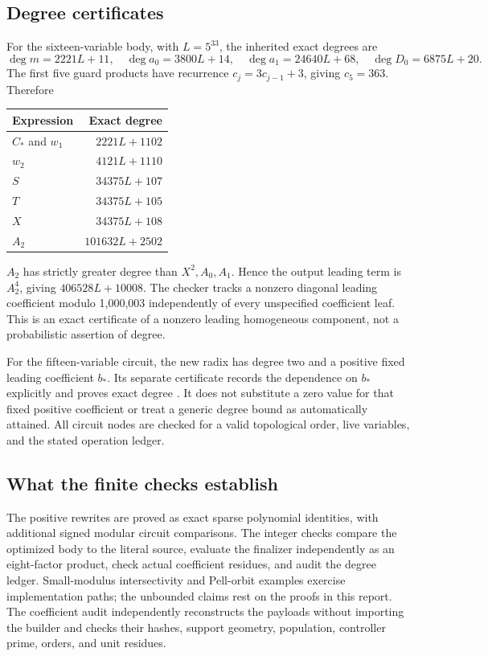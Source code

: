 \documentclass[11pt]{article}
\theoremstyle{definition}\newtheorem{definition}[theorem]{Definition}
\begin{document}
\subsection{Degree certificates}
For the sixteen-variable body, with $L=5^{33}$, the inherited exact degrees are
\[
 \deg m=2221L+11,\quad\deg a_0=3800L+14,\quad
 \deg a_1=24640L+68,\quad\deg D_0=6875L+20.
\]
The first five guard products have recurrence $c_j=3c_{j-1}+3$, giving $c_5=363$. Therefore
\begin{center}
\begin{tabular}{lr}
\toprule
Expression & Exact degree\\
\midrule
$C_*$ and $w_1$ & $2221L+1102$\\
$w_2$ & $4121L+1110$\\
$S$ & $34375L+107$\\
$T$ & $34375L+105$\\
$X$ & $34375L+108$\\
$A_2$ & $101632L+2502$\\
\bottomrule
\end{tabular}
\end{center}
$A_2$ has strictly greater degree than $X^2,A_0,A_1$. Hence the output leading term is $A_2^4$, giving $406528L+10008$. The checker tracks a nonzero diagonal leading coefficient modulo 1,000,003 independently of every unspecified coefficient leaf. This is an exact certificate of a nonzero leading homogeneous component, not a probabilistic assertion of degree.

For the fifteen-variable circuit, the new radix has degree two and a positive fixed leading coefficient $b_*$. Its separate certificate records the dependence on $b_*$ explicitly and proves exact degree \DegreeFifteenFormula. It does not substitute a zero value for that fixed positive coefficient or treat a generic degree bound as automatically attained. All circuit nodes are checked for a valid topological order, live variables, and the stated operation ledger.

\subsection{What the finite checks establish}
The positive rewrites are proved as exact sparse polynomial identities, with additional signed modular circuit comparisons. The integer checks compare the optimized body to the literal source, evaluate the finalizer independently as an eight-factor product, check actual coefficient residues, and audit the degree ledger. Small-modulus intersectivity and Pell-orbit examples exercise implementation paths; the unbounded claims rest on the proofs in this report. The coefficient audit independently reconstructs the payloads without importing the builder and checks their hashes, support geometry, population, controller prime, orders, and unit residues.
\end{document}
